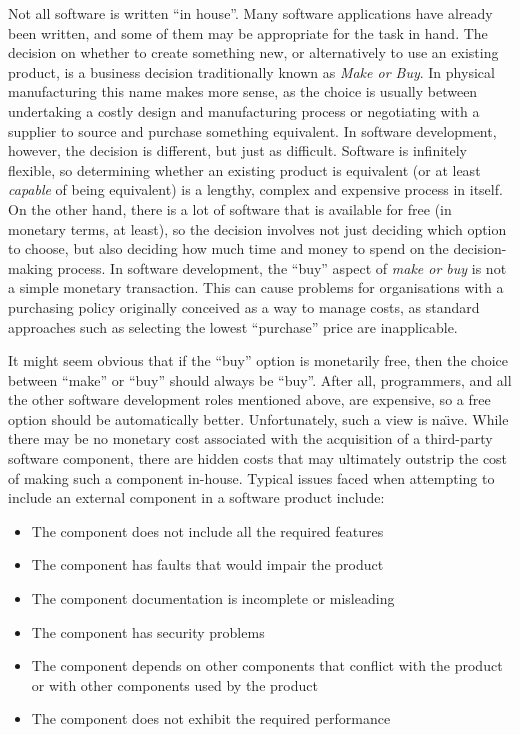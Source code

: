 Not all software is written \enquote{in house}. Many software applications have already been written, and some of them may be appropriate for the task in hand. The decision on whether to create something new, or alternatively to use an existing product, is a business decision traditionally known as \emph{Make or Buy}. In physical manufacturing this name makes more sense, as the choice is usually between undertaking a costly design and manufacturing process or negotiating with a supplier to source and purchase something equivalent. In software development, however, the decision is different, but just as difficult. Software is infinitely flexible, so determining whether an existing product is equivalent (or at least \emph{capable} of being equivalent) is a lengthy, complex and expensive process in itself. On the other hand, there is a lot of software that is available for free (in monetary terms, at least), so the decision involves not just deciding which option to choose, but also deciding how much time and money to spend on the decision-making process. In software development, the \enquote{buy} aspect of \emph{make or buy} is not a simple monetary transaction. This can cause problems for organisations with a purchasing policy originally conceived as a way to manage costs, as standard approaches such as selecting the lowest \enquote{purchase} price are inapplicable.

It might seem obvious that if the \enquote{buy} option is monetarily free, then the choice between \enquote{make} or \enquote{buy} should always be \enquote{buy}. After all, programmers, and all the other software development roles mentioned above, are expensive, so a free option should be automatically better. Unfortunately, such a view is na\"{\i}ve. While there may be no monetary cost associated with the acquisition of a third-party software component, there are hidden costs that may ultimately outstrip the cost of making such a component in-house. Typical issues faced when attempting to include an external component in a software product include:

\begin{itemize}
    \item The component does not include all the required features
    \item The component has faults that would impair the product
    \item The component documentation is incomplete or misleading
    \item The component has security problems
    \item The component depends on other components that conflict with the product or with other components used by the product
    \item The component does not exhibit the required performance
\end{itemize}

